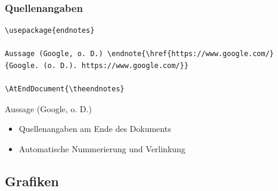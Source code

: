 \documentclass[aspectratio=169]{beamer}
\begin{document}
\begin{frame}[fragile]

\frametitle{Quellenangaben}


\begin{lstlisting}[language={[latex]TeX}]
\usepackage{endnotes}

Aussage (Google, o. D.) \endnote{\href{https://www.google.com/}{Google. (o. D.). https://www.google.com/}}

\AtEndDocument{\theendnotes}
\end{lstlisting}

\vspace{1em}

Aussage (Google, o. D.) 

\vspace{1em}

\begin{itemize}
  \item Quellenangaben am Ende des Dokuments
  \item Automatische Nummerierung und Verlinkung
\end{itemize}

\end{frame}


\subsection{Grafiken}
\end{document}
